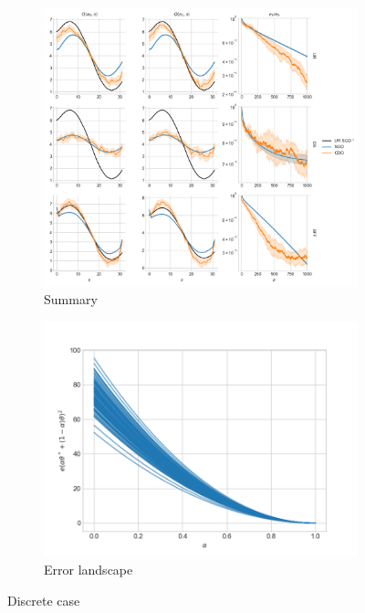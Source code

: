 \documentclass[10.5pt]{article}
\begin{document}
\begin{figure}[H]
    \centering
    \begin{subfigure}{.9\textwidth}
      \centering
      \includegraphics[width=\linewidth]{../figs/Q_ctrl_SGD_vs_CBO_summary_discrete_tabular.png}
      \caption{Summary}
      \label{fig:summary_disc}
    \end{subfigure}
    \begin{subfigure}{.5\textwidth}
      \centering
      \includegraphics[width=\linewidth]{../figs/Q_ctrl_landscape_plot_discrete_tabular.png}
      \caption{Error landscape}
      \label{fig:error_landscape_disc}
    \end{subfigure}
    \caption{Discrete case}
    \label{fig:disc}
\end{figure}
\end{document}
